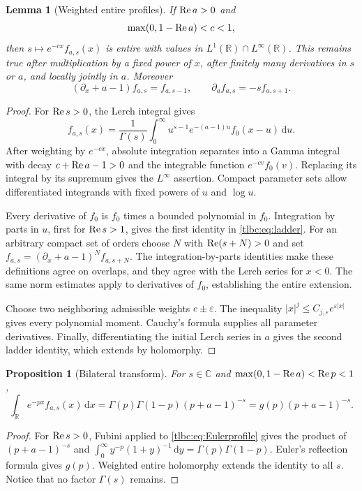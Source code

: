 \documentclass[11pt,letterpaper]{article}
\numberwithin{equation}{section}
\newtheorem{lemma}[theorem]{Lemma}
\newtheorem{proposition}[theorem]{Proposition}
\theoremstyle{definition}\newtheorem{definition}[theorem]{Definition}
\theoremstyle{remark}\newtheorem{remark}[theorem]{Remark}
\newcommand{\C}{\mathbb C}\newcommand{\R}{\mathbb R}\newcommand{\Q}{\mathbb Q}\newcommand{\Z}{\mathbb Z}
\newcommand{\dd}{\,\mathrm d}\newcommand{\ii}{\mathrm i}
\begin{document}
\begin{lemma}[Weighted entire profiles]\label{tlbc:lem:weighted}
If $\operatorname{Re} a>0$ and
\begin{equation}\label{tlbc:eq:stripone}
 \max(0,1-\operatorname{Re} a)<c<1,
\end{equation}
then $s\mapsto e^{-cx}f_{a,s}(x)$ is entire with values in
$L^1(\R)\cap L^\infty(\R)$. This remains true after multiplication by a fixed power of $x$, after finitely many derivatives in $s$ or $a$, and locally jointly in $a$. Moreover
\begin{equation}\label{tlbc:eq:ladder}
 (\partial_x+a-1)f_{a,s}=f_{a,s-1},\qquad
 \partial_a f_{a,s}=-s f_{a,s+1}.
\end{equation}
\end{lemma}
\begin{proof}
For $\operatorname{Re} s>0$, the Lerch integral gives
\begin{equation}\label{tlbc:eq:Eulerprofile}
 f_{a,s}(x)=\frac1{\Gamma(s)}\int_0^\infty
 u^{s-1}e^{-(a-1)u}f_0(x-u)\dd u.
\end{equation}
After weighting by $e^{-cx}$, absolute integration separates into a Gamma integral with decay $c+\operatorname{Re} a-1>0$ and the integrable function $e^{-cv}f_0(v)$. Replacing its integral by its supremum gives the $L^\infty$ assertion. Compact parameter sets allow differentiated integrands with fixed powers of $u$ and $\log u$.

Every derivative of $f_0$ is $f_0$ times a bounded polynomial in $f_0$. Integration by parts in $u$, first for $\operatorname{Re} s>1$, gives the first identity in \eqref{tlbc:eq:ladder}. For an arbitrary compact set of orders choose $N$ with $\operatorname{Re}(s+N)>0$ and set
$f_{a,s}=(\partial_x+a-1)^Nf_{a,s+N}$. The integration-by-parts identities make these definitions agree on overlaps, and they agree with the Lerch series for $x<0$. The same norm estimates apply to derivatives of $f_0$, establishing the entire extension.

Choose two neighboring admissible weights $c\pm\varepsilon$. The inequality
$|x|^j\le C_{j,\varepsilon}e^{\varepsilon|x|}$ gives every polynomial moment. Cauchy's formula supplies all parameter derivatives. Finally, differentiating the initial Lerch series in $a$ gives the second ladder identity, which extends by holomorphy.
\end{proof}

\begin{proposition}[Bilateral transform]\label{tlbc:prop:transform}
For $s\in\C$ and $\max(0,1-\operatorname{Re} a)<\operatorname{Re} p<1$,
\begin{equation}\label{tlbc:eq:transform}
 \int_\R e^{-px}f_{a,s}(x)\dd x
 =\Gamma(p)\Gamma(1-p)(p+a-1)^{-s}
 =g(p)(p+a-1)^{-s}.
\end{equation}
\end{proposition}
\begin{proof}
For $\operatorname{Re} s>0$, Fubini applied to \eqref{tlbc:eq:Eulerprofile} gives the product of $(p+a-1)^{-s}$ and
$\int_0^\infty y^{-p}(1+y)^{-1}\dd y=\Gamma(p)\Gamma(1-p)$. Euler's reflection formula gives $g(p)$. Weighted entire holomorphy extends the identity to all $s$. Notice that no factor $\Gamma(s)$ remains.
\end{proof}
\end{document}
